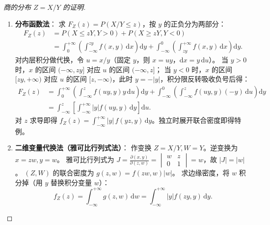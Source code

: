 ﻿\documentclass[lang=cn,11pt]{elegantbook}
\begin{document}
\begin{proof}[商的分布 $Z=X/Y$ 的证明]
\begin{enumerate}
    \item \textbf{分布函数法}：
    求 $F_Z(z) = P(X/Y \leqslant z)$，按 $y$ 的正负分为两部分：
    \begin{align*}
        F_Z(z) &= P(X \leqslant zY, Y > 0) + P(X \geqslant zY, Y < 0) \\
        &= \int_{0}^{+\infty} \left( \int_{-\infty}^{zy} f(x,y)\,\mathrm{d}x \right) \mathrm{d}y + \int_{-\infty}^{0} \left( \int_{zy}^{+\infty} f(x,y)\,\mathrm{d}x \right) \mathrm{d}y.
    \end{align*}
    对内层积分做代换，令 $u = x/y$（固定 $y$，则 $x = uy$，$\mathrm{d}x = y\,\mathrm{d}u$）。
    当 $y > 0$ 时，$x$ 的区间 $(-\infty, zy]$ 对应 $u$ 的区间 $(-\infty, z]$；
    当 $y < 0$ 时，$x$ 的区间 $[zy, +\infty)$ 对应 $u$ 的区间 $[z, -\infty)$，此时 $y = -|y|$，积分限反转吸收负号后得：
    \begin{align*}
    F_Z(z)& = \int_{0}^{+\infty} \left( \int_{-\infty}^{z} f(uy, y)y\,\mathrm{d}u \right) \mathrm{d}y + \int_{-\infty}^{0} \left( \int_{-\infty}^{z} f(uy, y)(-y)\,\mathrm{d}u \right) \mathrm{d}y\\
    & = \int_{-\infty}^{z} \left[ \int_{-\infty}^{+\infty} |y|f(uy, y)\,\mathrm{d}y \right] \mathrm{d}u.
    \end{align*}
    对 $z$ 求导即得 $f_Z(z) = \displaystyle\int_{-\infty}^{+\infty}|y|\,f(yz, y)\,\mathrm{d}y$。独立时展开联合密度即得特例。

    \item \textbf{二维变量代换法（雅可比行列式法）}：
    作变换 $Z = X/Y, W = Y$。逆变换为 $x = zw, y = w$。
    雅可比行列式为 $J = \frac{\partial(x,y)}{\partial(z,w)} = \begin{vmatrix} w & z \\ 0 & 1 \end{vmatrix} = w$，故 $|J| = |w|$。
    $(Z,W)$ 的联合密度为 $g(z,w) = f(zw, w) |w|$。
    求边缘密度，将 $w$ 积分掉（用 $y$ 替换积分变量 $w$）：
    \[
    f_Z(z) = \int_{-\infty}^{+\infty} g(z,w)\,\mathrm{d}w = \int_{-\infty}^{+\infty} |y|f(zy, y)\,\mathrm{d}y.
    \]
\end{enumerate}
\end{proof}
\end{document}
